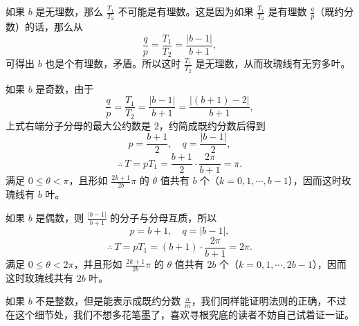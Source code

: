 如果 $b$ 是无理数，那么 $\frac{T_1}{T_2}$ 不可能是有理数。这是因为如果 $\frac{T_1}{T_2}$ 是有理数 $\frac{q}{p}$（既约分数）的话，那么从
\[
  \frac{q}{p} = \frac{T_1}{T_2} = \frac{|b-1|}{b+1},
\]
可得出 $b$ 也是个有理数，矛盾。所以这时 $\frac{T_1}{T_2}$ 是无理数，从而玫瑰线有无穷多叶。

如果 $b$ 是奇数，由于
\[
  \frac{q}{p} = \frac{T_1}{T_2} = \frac{|b-1|}{b+1} = \frac{|(b+1)-2|}{b+1},
\]
上式右端分子分母的最大公约数是 $2$，约简成既约分数后得到
\[
  p = \frac{b+1}{2},\quad q = \frac{|b-1|}{2},
\]
\[
  \therefore\ T = pT_1 = \frac{b+1}{2}\cdot\frac{2\pi}{b+1} = \pi.
\]
满足 $0 \leqslant \theta < \pi$，且形如 $\frac{2k+1}{2b}\pi$ 的 $\theta$ 值共有 $b$ 个（$k=0, 1, \cdots, b-1$），因而这时玫瑰线有 $b$ 叶。

如果 $b$ 是偶数，则 $\frac{|b-1|}{b+1}$ 的分子与分母互质，所以
\[
  p = b+1,\quad q = |b-1|,
\]
\[
  \therefore\ T = pT_1 = (b+1)\cdot\frac{2\pi}{b+1} = 2\pi.
\]
满足 $0 \leqslant \theta < 2\pi$，并且形如 $\frac{2k+1}{2b}\pi$ 的 $\theta$ 值共有 $2b$ 个（$k=0, 1, \cdots, 2b-1$），因而这时玫瑰线共有 $2b$ 叶。

如果 $b$ 不是整数，但是能表示成既约分数 $\frac{n}{m}$，我们同样能证明法则的正确，不过在这个细节处，我们不想多花笔墨了，喜欢寻根究底的读者不妨自己试着证一证。
